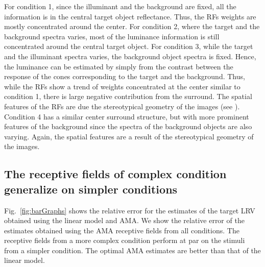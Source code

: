 \documentclass{jov}
\begin{document}
For condition 1, since the illuminant and the background are fixed, all the information is in the central target object reflectance. Thus, the RFs weights are mostly concentrated around the center. For condition 2, where the target and the background spectra varies, most of the luminance information is still concentrated around the central target object. For condition 3, while the target and the illuminant spectra varies, the background object spectra is fixed. Hence, the luminance can be estimated by simply from the contrast between the response of the cones corresponding to the target and the background. Thus, while the RFs show a trend of weights concentrated at the center similar to condition 1, there is large negative contribution from the surround. The spatial features of the RFs are due the stereotypical geometry of the images (see ). Condition 4 has a similar center surround structure, but with more prominent features of the background since the spectra of the background objects are also varying. Again, the spatial features are a result of the stereotypical geometry of the images.

\subsection{The receptive fields of complex condition generalize on simpler conditions}
Fig.~\ref{fig:barGraphs} shows the relative error for the estimates of the target LRV obtained using the linear model and AMA. We show the relative error of the estimates obtained using the AMA receptive fields from all conditions. The receptive fields from a more complex condition perform at par on the stimuli from a simpler condition. The optimal AMA estimates are better than that of the linear model.
\end{document}
